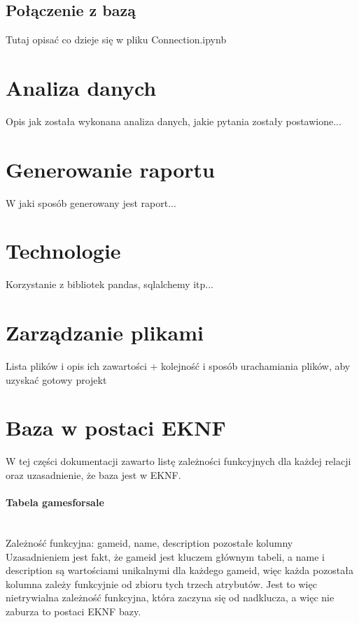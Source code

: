 \documentclass{article}
\begin{document}
	\subsection{Połączenie z bazą}
	Tutaj opisać co dzieje się w pliku Connection.ipynb
	
	
	
	
	\section{Analiza danych}
	
	Opis jak została wykonana analiza danych, jakie pytania zostały postawione...
	
	\section{Generowanie raportu}
	
	W jaki sposób generowany jest raport...
	
	\section{Technologie}
	
	Korzystanie z bibliotek pandas, sqlalchemy itp...
	
	
	
	\section{Zarządzanie plikami}
	Lista plików i opis ich zawartości + kolejność i sposób urachamiania plików, aby uzyskać gotowy projekt
	
	\section{Baza w postaci EKNF}
	W tej części dokumentacji zawarto listę zależności funkcyjnych dla każdej relacji oraz uzasadnienie, że baza jest w EKNF.
	
	\paragraph{Tabela games\textunderscore for\textunderscore sale}\mbox{}\vspace{0.2cm} \\
	Zależność funkcyjna: \textbraceleft game\textunderscore id, name, description\textbraceright \mbox{} \textrightarrow \mbox{} pozostałe kolumny \vspace{0.2cm} \\
	\noindent Uzasadnieniem jest fakt, że game\textunderscore id jest kluczem głównym tabeli, a name i description są wartościami unikalnymi dla każdego game\textunderscore id, więc każda pozostała kolumna zależy funkcyjnie od zbioru tych trzech atrybutów. Jest to więc nietrywialna zależność funkcyjna, która zaczyna się od nadklucza, a więc nie zaburza to postaci EKNF bazy.
\end{document}
